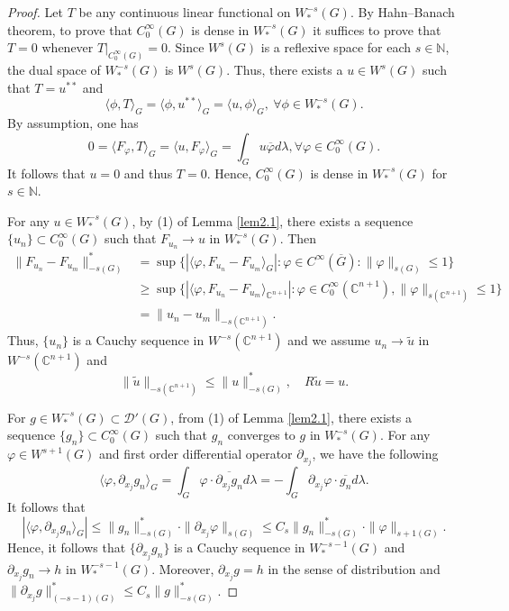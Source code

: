 \documentclass[a4paper,centertags,oneside,12pt]{amsart}
\numberwithin{equation}{section}
\begin{document}
\begin{proof}
Let $T$ be any continuous linear functional on $W_\ast^{-s}(G)$. By Hahn--Banach theorem, to prove that $C_0^\infty(G)$ is dense in $W_\ast^{-s}(G)$ it suffices to prove that $T=0$ whenever $T|_{C_0^\infty(G)}=0$. Since $W^s(G)$ is a reflexive space for each $s\in\mathbb N$, the dual space of $W_\ast^{-s}(G)$ is $W^s(G)$. Thus, there exists a $u\in W^s(G)$ such that $T=u^{\ast\ast}$ and 
    $$\langle\phi, T\rangle_G=\langle\phi, u^{\ast\ast}\rangle_G=\langle u, \phi\rangle_G, ~\forall \phi\in  W_\ast^{-s}(G).$$
   By assumption, one has 
    $$0=\langle F_\varphi, T\rangle_G=\langle  u, F_\varphi\rangle_G=\int_{G}u\overline \varphi d\lambda, \forall \varphi\in C_0^\infty(G).$$
    It follows that $u=0$ and thus $T=0$. Hence, $C_0^\infty(G)$ is dense in $W_\ast^{-s}(G)$ for $s\in\mathbb N.$

    For any $u\in W_\ast^{-s}(G)$, by (1) of Lemma \ref{lem2.1}, there exists a sequence $\{u_n\}\subset C_0^\infty(G)$ such that $F_{u_n}\rightarrow u$ in $W_\ast^{-s}(G)$.
    Then \begin{equation*}
    \begin{split}
        \|F_{u_n}-F_{u_m}\|^\ast_{-s(G)}
        &=\sup\{|\langle  \varphi, F_{u_n}-F_{u_m}\rangle_G|: \varphi\in C^\infty(\overline G): \|\varphi\|_{s(G)}\leq 1\}\\
        &\geq \sup\{|\langle \varphi, F_{u_n}-F_{u_m}\rangle_{\mathbb C^{n+1}}|: \varphi\in C_0^\infty(\mathbb C^{n+1}), \|\varphi\|_{s(\mathbb C^{n+1})}\leq 1\}\\
        &=\|u_n-u_m\|_{-s(\mathbb C^{n+1})}.
        \end{split}
    \end{equation*}
    Thus, $\{u_n\}$ is a Cauchy sequence in $W^{-s}(\mathbb C^{n+1})$ and we assume $u_n\rightarrow \tilde u$ in $W^{-s}(\mathbb C^{n+1})$ and 
    \begin{equation*}
        \|\tilde u\|_{-s(\mathbb C^{n+1})}\leq \|u\|_{-s(G)}^\ast, \quad R\tilde u=u.
    \end{equation*}

  For $g\in W^{-s}_\ast(G)\subset\mathcal D'(G)$,  from (1) of Lemma \ref{lem2.1}, there exists a sequence $\{g_n\}\subset C_0^\infty(G)$ such that $g_n$ converges to $g$ in $W^{-s}_\ast(G)$. For any $\varphi\in W^{s+1}(G)$ and first order  differential operator $\partial_{x_j}$, we have the following 
    \begin{equation*}
        \langle \varphi, \partial_{x_j}g_n\rangle_G=\int_{G}\varphi\cdot\overline {\partial_{x_j}g_n} d\lambda=-\int_{G}  {\partial_{x_j}}\varphi\cdot\overline{g_n}  d\lambda.
    \end{equation*}
It follows that 
\begin{equation*}
    |\langle \varphi, \partial_{x_j}g_n\rangle_G|\leq \|g_n\|^\ast_{-s(G)}\cdot\|\partial_{x_j}\varphi\|_{s(G)}\leq C_s\|g_n\|^\ast_{-s(G)}\cdot\|\varphi\|_{s+1(G)}.
\end{equation*}
Hence, it follows that $\{\partial_{x_j}g_n\}$ is a Cauchy sequence in $W_\ast^{-s-1}(G)$ and $\partial_{x_j}g_n\rightarrow h$ in $W^{-s-1}_\ast(G)$. Moreover, $\partial_{x_j}g=h$ in the sense of distribution and $\|\partial_{x_j}g\|^\ast_{(-s-1)(G)}\leq C_s\|g\|^\ast_{-s(G)}$.
\end{proof} 
\end{document}
